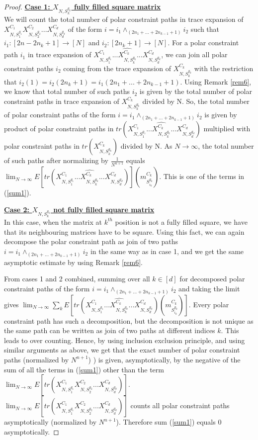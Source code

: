 \documentclass[12pt]{amsart}
\theoremstyle{definition}
\theoremstyle{remark}
\begin{document}
\begin{proof}
\textbf{\underline{Case 1: $X_{N,S_k^{g_k}}$ fully filled square matrix}}\\
We will count the total number of polar constraint paths in trace expansion of $X_{N,S_1^{g_1}}^{C_1}X_{N,S_2^{g_2}}^{C_2}...X_{N,S_d^{g_d}}^{C_d}$ of the form $i= i_1 \wedge_{(2n_1+...+2n_{k-1}+1)} i_2$ such that $i_1:[2n-2n_k +1] \to [N]$ and $i_2:[2n_k+1] \to [N]$. For a polar constraint path $i_1$ in trace expansion of $X_{N,S_1^{g_1}}^{C_1}...\widehat{X_{N,S_k^{g_k}}^{C_k}}...X_{N,S_d^{g_d}}^{C_d}$, we can join all polar constraint paths $i_2$ coming from the trace expansion of $X_{N,S_k^{g_k}}^{C_k}$ with the restriction that $i_2(1)=i_2(2n_k+1)=i_1(2n_1+...+2n_{k-1}+1)$. Using Remark \ref{rem6}, we know that total number of such paths $i_2$ is given by the total number of polar constraint paths in trace expansion of $X_{N,S_k^{g_k}}^{C_k}$ divided by N. So, the total number of polar constraint paths of the form $i= i_1 \wedge_{(2n_1+...+2n_{k-1}+1)} i_2$ is given by product of polar constraint paths in $tr(X_{N,S_1^{g_1}}^{C_1}...\widehat{X_{N,S_k^{g_k}}^{C_k}}...X_{N,S_d^{g_d}}^{C_d})$ multiplied with polar constraint paths in $tr(X_{N,S_k^{g_k}}^{C_k})$ divided by N. As $N \to \infty$, the total number of such paths after normalizing by $\frac{1}{N^{n+1}}$ equals $\lim_{N \to \infty} E[tr(X_{N,S_1^{g_1}}^{C_1}...\widehat{X_{N,S_k^{g_k}}^{C_k}}...X_{N,S_d^{g_d}}^{C_d})](m_{S_{i_k}^{g_k}}^{C_k})$. This is one of the terms in (\ref{sum1}). \par

\textbf{\underline{Case 2: $X_{N,S_k^{g_k}}$ not fully filled square matrix}}\\
In this case, when the matrix at $k^{th}$ position is not a fully filled square, we have that its neighbouring matrices have to be square. Using this fact, we can again decompose the polar constraint path as join of two paths $i= i_1 \wedge_{(2n_1+...+2n_{k-1}+1)} i_2$ in the same way as in case 1, and we get the same asymptotic estimate by using Remark \ref{rem6}. \par

\vspace{4pt}
 From cases 1 and 2 combined, summing over all $k \in [d]$ for decomposed polar constraint paths of the form $i= i_1 \wedge_{(2n_1+...+2n_{k-1}+1)} i_2$ and taking the limit gives $\lim_{N \to \infty} \sum_k E[tr(X_{N,S_1^{g_1}}^{C_1}...\widehat{X_{N,S_k^{g_k}}^{C_k}}...X_{N,S_d^{g_d}}^{C_d})(m_{S_{i_k}^{g_k}}^{C_k})]$. Every polar constraint path has such a decomposition, but the decomposition is not unique as the same path can be written as join of two paths at different indices $k$. This leads to over counting. Hence, by using inclusion exclusion principle, and using similar arguments as above, we get that the exact number of polar constraint paths (normalized by $N^{n+1}$) ) is given, asymptotically, by the negative of the sum of all the terms in (\ref{sum1}) other than the term $\lim_{N \to \infty} E[tr(X_{N,S_1^{g_1}}^{C_1}X_{N,S_2^{g_2}}^{C_2}...X_{N,S_d^{g_d}}^{C_d})]$. $\lim_{N \to \infty} E[tr(X_{N,S_1^{g_1}}^{C_1}X_{N,S_2^{g_2}}^{C_2}...X_{N,S_d^{g_d}}^{C_d})]$ counts all polar constraint paths asymptotically (normalized by $N^{n+1}$). Therefore sum (\ref{sum1}) equals 0 asymptotically.



\end{proof}
\end{document}
